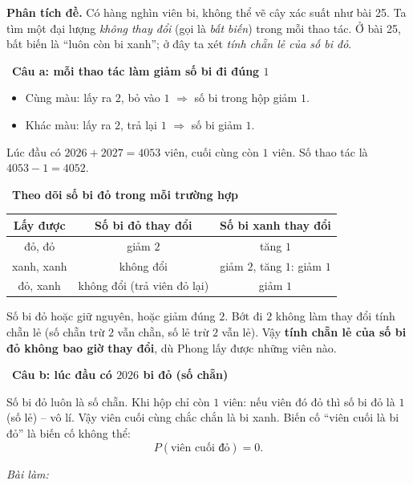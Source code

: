 \documentclass[11pt]{article}
\newif\ifsol \solfalse
\newcommand{\probsol}[1]{%
  \begin{lrbox}{\solmeasure}\begin{minipage}{\dimexpr\linewidth-24pt\relax}#1\end{minipage}\end{lrbox}%
  \ifsol
    \begin{solbox}#1\end{solbox}%
  \else
    \setlength{\solht}{\dimexpr\ht\solmeasure+\dp\solmeasure+0.85cm\relax}%
    \ifdim\solht<1.35cm\setlength{\solht}{1.35cm}\fi
    \ifdim\solht>\StudentMaxWork\setlength{\solht}{\StudentMaxWork}\fi
    \begin{tcolorbox}[colback=white,colframe=Line,boxrule=0.8pt,arc=5pt,
      left=8pt,right=8pt,top=4pt,bottom=4pt,height=\solht]{\footnotesize\color{Slate}\itshape\WorkWord}\end{tcolorbox}%
  \fi}
\newlength{\StudentMaxWork}\setlength{\StudentMaxWork}{7.5cm}
\newcommand{\step}[2]{\par\smallskip\noindent{\bfseries\color{tmBlue!85!black}\StepWord~#1.}\ {\bfseries #2}\par\nopagebreak}
\def\WorkWord{Bài làm:}
\def\StepWord{Bước}
\begin{document}
\probsol{
\textbf{Phân tích đề.} Có hàng nghìn viên bi, không thể vẽ cây xác suất như bài 25. Ta tìm một đại lượng \emph{không thay đổi} (gọi là
\emph{bất biến}) trong mỗi thao tác. Ở bài 25, bất biến là ``luôn còn bi xanh''; ở đây ta xét \emph{tính chẵn lẻ của số bi đỏ}.

\step{1}{Câu a: mỗi thao tác làm giảm số bi đi đúng $1$}
\begin{itemize}[leftmargin=1.2em,itemsep=1pt,topsep=2pt]
\item Cùng màu: lấy ra $2$, bỏ vào $1$ $\Rightarrow$ số bi trong hộp giảm $1$.
\item Khác màu: lấy ra $2$, trả lại $1$ $\Rightarrow$ số bi giảm $1$.
\end{itemize}
Lúc đầu có $2026+2027=4053$ viên, cuối cùng còn $1$ viên. Số thao tác là $4053-1=4052$.

\step{2}{Theo dõi số bi đỏ trong mỗi trường hợp}
\begin{center}\begin{tabular}{|c|c|c|}\hline
Lấy được & Số bi đỏ thay đổi & Số bi xanh thay đổi\\\hline
đỏ, đỏ & giảm $2$ & tăng $1$\\\hline
xanh, xanh & không đổi & giảm $2$, tăng $1$: giảm $1$\\\hline
đỏ, xanh & không đổi (trả viên đỏ lại) & giảm $1$\\\hline
\end{tabular}\end{center}
\begin{proofbox}Số bi đỏ hoặc giữ nguyên, hoặc giảm đúng $2$. Bớt đi $2$ không làm thay đổi tính chẵn lẻ (số chẵn trừ $2$ vẫn chẵn,
số lẻ trừ $2$ vẫn lẻ). Vậy \textbf{tính chẵn lẻ của số bi đỏ không bao giờ thay đổi}, dù Phong lấy được những viên nào.\end{proofbox}

\step{3}{Câu b: lúc đầu có $2026$ bi đỏ (số chẵn)}
Số bi đỏ luôn là số chẵn. Khi hộp chỉ còn $1$ viên: nếu viên đó đỏ thì số bi đỏ là $1$ (số lẻ) -- vô lí. Vậy viên cuối cùng chắc chắn
là bi xanh. Biến cố ``viên cuối là bi đỏ'' là biến cố không thể:
\[P(\text{viên cuối đỏ})=0.\]

}
\end{document}
